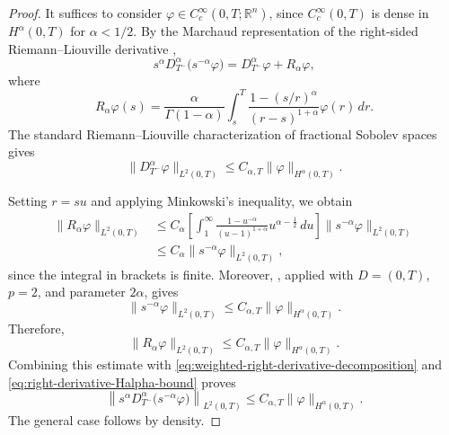 \documentclass[preprint,12pt]{elsarticle}
\theoremstyle{definition}
\theoremstyle{plain}
\begin{document}
\begin{proof}
It suffices to consider
$\varphi\in C_c^\infty(0,T;\mathbb R^n)$, since
$C_c^\infty(0,T)$ is dense in $H^\alpha(0,T)$ for $\alpha<1/2$.
By the Marchaud representation of the right-sided
Riemann--Liouville derivative \cite{Samko1993},
\begin{equation}
\label{eq:weighted-right-derivative-decomposition}
    s^\alpha
    D_{T^-}^{\alpha}
    \bigl(s^{-\alpha}\varphi\bigr)
    =
    D_{T^-}^{\alpha}\varphi
    +
    R_\alpha\varphi,
\end{equation}
where
\begin{equation*}
    R_\alpha\varphi(s)
    =
    \frac{\alpha}{\Gamma(1-\alpha)}
    \int_s^T
    \frac{1-(s/r)^\alpha}
         {(r-s)^{1+\alpha}}
    \varphi(r)\,dr.
\end{equation*}
The standard Riemann--Liouville characterization of fractional Sobolev
spaces gives
\begin{equation}
\label{eq:right-derivative-Halpha-bound}
    \|D_{T^-}^{\alpha}\varphi\|_{L^2(0,T)}
    \leq
    C_{\alpha,T}
    \|\varphi\|_{H^\alpha(0,T)}.
\end{equation}

Setting $r=su$ and applying Minkowski's inequality, we obtain
\begin{align*}
    \|R_\alpha\varphi\|_{L^2(0,T)}
    &\leq
    C_\alpha
    \left[
        \int_1^\infty
        \frac{1-u^{-\alpha}}
             {(u-1)^{1+\alpha}}
        u^{\alpha-\frac12}\,du
    \right]
    \|s^{-\alpha}\varphi\|_{L^2(0,T)}
    \\
    &\leq
    C_\alpha
    \|s^{-\alpha}\varphi\|_{L^2(0,T)},
\end{align*}
since the integral in brackets is finite. Moreover,
\cite[Eq.~(17)]{Dyda2004FractionalHardy}, applied with
$D=(0,T)$, $p=2$, and parameter $2\alpha$, gives
\begin{equation*}
    \|s^{-\alpha}\varphi\|_{L^2(0,T)}
    \leq
    C_{\alpha,T}
    \|\varphi\|_{H^\alpha(0,T)}.
\end{equation*}
Therefore,
\begin{equation*}
    \|R_\alpha\varphi\|_{L^2(0,T)}
    \leq
    C_{\alpha,T}
    \|\varphi\|_{H^\alpha(0,T)}.
\end{equation*}
Combining this estimate with
\eqref{eq:weighted-right-derivative-decomposition} and
\eqref{eq:right-derivative-Halpha-bound} proves
\begin{equation*}
    \left\|
        s^\alpha
        D_{T^-}^{\alpha}
        \bigl(s^{-\alpha}\varphi\bigr)
    \right\|_{L^2(0,T)}
    \leq
    C_{\alpha,T}
    \|\varphi\|_{H^\alpha(0,T)}.
\end{equation*}
The general case follows by density.
\end{proof}
\end{document}
